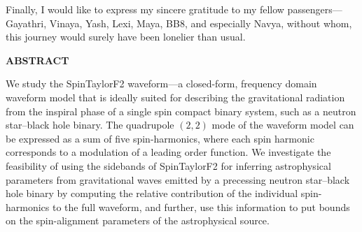 \documentclass[12pt, a4wide]{report}
\begin{document}
Finally, I would like to express my sincere gratitude to my fellow 
passengers---Gayathri, Vinaya, Yash, Lexi, Maya, BB8, and especially Navya,
without whom, this journey would surely have been lonelier than usual.

\clearpage

\begin{center}
\textbf{ABSTRACT}\\
\end{center}

We study the SpinTaylorF2 waveform---a closed-form, frequency domain waveform
model that is ideally suited for describing the gravitational radiation from
the inspiral phase of a single spin compact binary system, such as a neutron
star--black hole binary. The quadrupole $(2,2)$ mode of the waveform model can
be expressed as a sum of five spin-harmonics, where each spin harmonic
corresponds to a modulation of a leading order function. We investigate the
feasibility of using the sidebands of SpinTaylorF2 for inferring astrophysical
parameters from gravitational waves emitted by a precessing neutron 
star--black hole binary by computing the relative contribution of the individual
spin-harmonics to the full waveform, and further, use this information to put
bounds on the spin-alignment parameters of the astrophysical source.

\clearpage
\tableofcontents
\listoffigures
\newpage
{}
\setcounter{page}{1}






% 


\appendix

% 




{\normalsize
}
\end{document}
